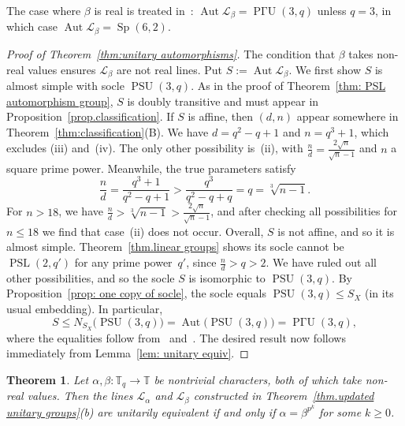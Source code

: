 \documentclass[11pt]{article}
\newtheorem{theorem}[theo]{Theorem}
\theoremstyle{definition}
\numberwithin{equation}{section}
\begin{document}
The case where $\beta$ is real is treated in~\cite{Taylor:92}: $\operatorname{Aut} \mathscr{L}_\beta = \operatorname{P\text{$\Gamma$}U}(3,q)$ unless $q=3$, in which case $\operatorname{Aut} \mathscr{L}_\beta = \operatorname{Sp}(6,2)$.

\begin{proof}[Proof of Theorem~\ref{thm:unitary automorphisms}]
The condition that $\beta$ takes non-real values ensures $\mathscr{L}_\beta$ are not real lines.
Put $S:= \operatorname{Aut} \mathscr{L}_\beta$.
We first show $S$ is almost simple with socle $\operatorname{PSU}(3,q)$.
As in the proof of Theorem~\ref{thm: PSL automorphism group}, $S$ is doubly transitive and must appear in Proposition~\ref{prop.classification}.
If $S$ is affine, then $(d,n)$ appear somewhere in Theorem~\ref{thm:classification}(B).
We have $d=q^2-q+1$ and $n=q^3+1$, which excludes (iii) and~(iv).
The only other possibility is~(ii), with $\frac{n}{d} = \frac{2\sqrt{n}}{\sqrt{n}-1}$ and $n$ a square prime power.
Meanwhile, the true parameters satisfy
\[
\frac{n}{d}=\frac{q^3+1}{q^2-q+1} > \frac{q^3}{q^2-q+q}=q=\sqrt[3]{n-1}.
\]
For $n > 18$, we have $\frac{n}{d} > \sqrt[3]{n-1} > \frac{2\sqrt{n}}{\sqrt{n}-1}$, and after checking all possibilities for $n \leq 18$ we find that case~(ii) does not occur.
Overall, $S$ is not affine, and so it is almost simple.
Theorem~\ref{thm.linear groups} shows its socle cannot be $\operatorname{PSL}(2,q')$ for any prime power~$q'$, since $\frac{n}{d} > q > 2$.
We have ruled out all other possibilities, and so the socle $S$ is isomorphic to $\operatorname{PSU}(3,q)$.
By Proposition~\ref{prop: one copy of socle}, the socle equals $\operatorname{PSU}(3,q)\leq S_X$ (in its usual embedding).
In particular,
\begin{equation}
\label{eq: PSU normalizer}
S \leq N_{S_X}\bigl( \operatorname{PSU}(3,q) \bigr) = \operatorname{Aut}\bigl( \operatorname{PSU}(3,q) \bigr) = \operatorname{P\text{$\Gamma$}U}(3,q),
\end{equation}
where the equalities follow from~\cite[Theorem~4.2A]{DixonMortimer:96} and~\cite[\S 3.6.3]{Wilson:09}.
The desired result now follows immediately from Lemma~\ref{lem: unitary equiv}.
\end{proof}


\begin{theorem}
\label{thm:unitary equivalences}
Let $\alpha,\beta \colon \mathbb{T}_q \to \mathbb{T}$ be nontrivial characters, both of which take non-real values.
Then the lines $\mathscr{L}_\alpha$ and $\mathscr{L}_\beta$ constructed in Theorem~\ref{thm.updated unitary groups}(b) are unitarily equivalent if and only if $\alpha = \beta^{p^k}$ for some $k \geq 0$.
\end{theorem}
\end{document}
